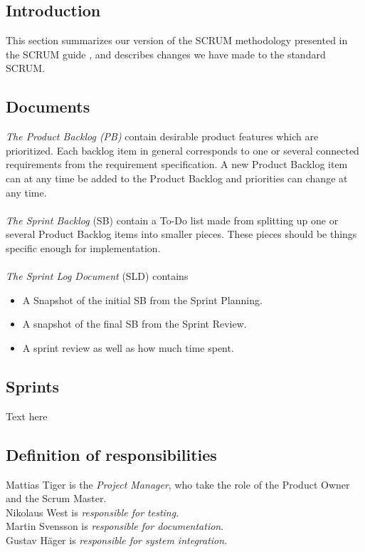 
\subsection{Introduction}
This section summarizes our version of the SCRUM methodology presented in the SCRUM guide \cite{scrumGuide}, and describes changes we have made to the standard SCRUM.  

\subsection{Documents}
\emph{The Product Backlog (PB)} contain desirable product features which are prioritized. Each backlog item in general corresponds to one or several connected requirements from the requirement specification.
A new Product Backlog item can at any time be added to the Product Backlog and priorities can change at any time. \\
\\
\emph{The Sprint Backlog} (SB) contain a To-Do list made from splitting up one or several Product Backlog items into smaller pieces. These pieces should be things specific enough for implementation. \\
\\
\emph{The Sprint Log Document} (SLD) contains
\begin{itemize}
  \item A Snapshot of the initial SB from the Sprint Planning.
  \item A snapshot of the final SB from the Sprint Review.
  \item A sprint review as well as how much time spent.
\end{itemize}

\subsection{Sprints}
Text here

\subsection{Definition of responsibilities}
Mattias Tiger is the \emph{Project Manager}, who take the role of the Product Owner and the Scrum Master.\\
Nikolaus West is \emph{responsible for testing}.\\
Martin Svensson is \emph{responsible for documentation}.\\
Gustav Häger is \emph{responsible for system integration}. 

